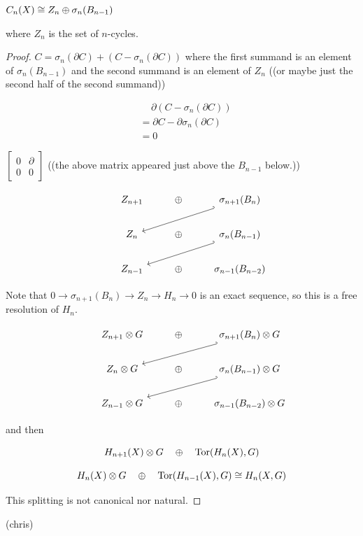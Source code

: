 \documentclass[11pt,leqno,oneside]{amsart}
\newenvironment{dateenv}{
  \vspace{1em}
}{
  \vspace{1em}
}
\newcommand{\mydate}[4]{
  \newdate{#1}{#2}{#3}{#4}
  \begin{dateenv}
    \hfill\displaydate{#1}
  \end{dateenv}
}
\numberwithin{thm}{section}
\renewcommand{\d}{\partial}
\begin{document}
\begin{lem}
  $C_n(X) \mathrel{\cong} Z_n \oplus \sigma_n(B_{n-1})$

  where $Z_n$ is the set of $n$-cycles.
\end{lem}
\begin{proof}
  $C = \sigma_n(\d C) + (C - \sigma_n(\d C))$
  where the first summand is an element of $\sigma_n(B_{n-1})$ and the second summand is an element of $Z_n$ ((or maybe just the second half of the second summand))

  \begin{align}
    &\quad\, \d(C - \sigma_n(\d C)) \\
    &= \d C - \d\sigma_n(\d C) \\
    &= 0
  \end{align}

  $\begin{bmatrix}
    0 & \d \\
    0 & 0
  \end{bmatrix}$
  ((the above matrix appeared just above the $B_{n-1}$ below.))

  $$\begin{tikzcd}
    &Z_{n+1} &\dsum &\sigma_{n+1}(B_n) \arrow[lld, hook', ""] \\
    &Z_{n} &\dsum &\sigma_{n}(B_{n-1}) \arrow[lld, hook', ""] \\
    &Z_{n-1} &\dsum &\sigma_{n-1}(B_{n-2})
  \end{tikzcd}$$

  Note that $0 \to \sigma_{n+1}(B_n) \to Z_n \to H_n \to 0$ is an exact sequence, so this is a free resolution of $H_n$.

  $$\begin{tikzcd}
    &Z_{n+1} \tprod G &\dsum &\sigma_{n+1}(B_n) \tprod G \arrow[lld, hook', ""] \\
    &Z_{n} \tprod G &\dsum &\sigma_{n}(B_{n-1}) \tprod G \arrow[lld, hook', ""] \\
    &Z_{n-1} \tprod G &\dsum &\sigma_{n-1}(B_{n-2}) \tprod G
  \end{tikzcd}$$

  and then

  $$H_{n+1}(X) \otimes G \quad\oplus\quad \operatorname{Tor}(H_n(X), G)$$

  $$H_{n}(X) \otimes G \quad\oplus\quad \operatorname{Tor}(H_{n-1}(X), G) \mathrel{\cong} H_n(X, G)$$

  This splitting is not canonical nor natural.
\end{proof}

\mydate{dl}{19}{4}{2017}
(chris)
\end{document}
